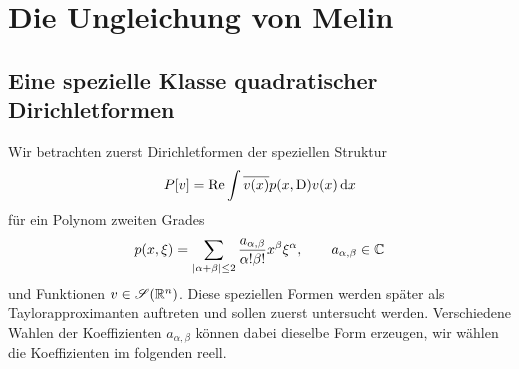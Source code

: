 \chapter{Die Ungleichung von Melin}

\section{Eine spezielle Klasse quadratischer Dirichletformen}
Wir betrachten zuerst Dirichletformen der speziellen Struktur
\begin{equation}
   P[v] = \operatorname{Re}  \int \overline{v(x)}p(x,\mathrm D)v(x)\,\mathrm d x 
\end{equation}
für ein Polynom zweiten Grades
\begin{equation}
    p(x,\xi) = \sum_{|\alpha+\beta|\le 2} \frac{ a_{\alpha,\beta}}{\alpha!\beta!} x^\beta \xi^\alpha,\qquad a_{\alpha,\beta}\in\mathbb C
\end{equation}
und Funktionen $v\in\mathscr S(\mathbb R^n)$. Diese speziellen Formen werden später als Taylorapproximanten auftreten und sollen zuerst untersucht werden. Verschiedene Wahlen der Koeffizienten $a_{\alpha,\beta}$ können dabei dieselbe Form erzeugen, wir wählen die Koeffizienten im folgenden reell.

